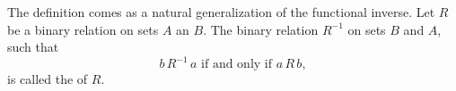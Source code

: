 The definition comes as a natural generalization of the functional inverse.
Let $R$ be a binary relation on sets $A$ an $B$.
The binary relation $R^{-1}$ on sets $B$ and $A$, such that
\[
    b\,R^{-1}\,a \text{ if and only if } a\,R\,b,
\]
is called the  of $R$.
